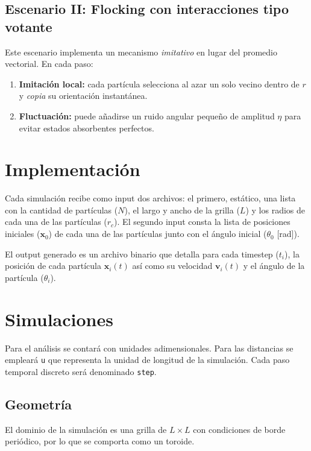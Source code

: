 \documentclass{article}
\begin{document}
\subsection{Escenario II: Flocking con interacciones tipo votante \cite{baglietto2018}}
Este escenario implementa un mecanismo \emph{imitativo} en lugar del promedio vectorial. En cada paso:
\begin{enumerate}
  \item \textbf{Imitación local:} cada partícula selecciona al azar un solo vecino dentro de \(r\) y \emph{copia} su orientación instantánea.
  \item \textbf{Fluctuación:} puede añadirse un ruido angular pequeño de amplitud \(\eta\) para evitar estados absorbentes perfectos.
\end{enumerate}

\section{Implementación}

Cada simulación recibe como input dos archivos: el primero, estático, una lista con la cantidad de partículas (\( N\)), el largo y ancho de la grilla (\( L\)) y los radios de cada una de las partículas (\( r_c\)). El segundo input consta la lista de posiciones iniciales (\(\mathbf x_0\)) de cada una de las partículas junto con el ángulo inicial (\( \theta_0\) [rad]).

El output generado es un archivo binario que detalla para cada timestep (\(t_i\)), la posición de cada partícula \(\mathbf x_i(t)\) así como su velocidad  \(\mathbf v_i(t)\) y el ángulo de la partícula (\( \theta_i\)).

\section{Simulaciones}
  
Para el análisis se contará con unidades adimensionales. Para las distancias se empleará \texttt{u} que representa la unidad de longitud de la simulación. Cada paso temporal discreto será denominado \texttt{step}.

\subsection{Geometría}

El dominio de la simulación es una grilla de \(L\times L\) con condiciones de borde periódico, por lo que se comporta como un toroide.
\end{document}
